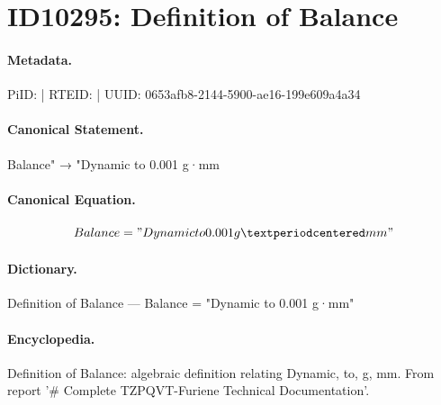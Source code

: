 \section*{ID10295: Definition of Balance}
\paragraph{Metadata.}
PiID:  | RTEID:  | UUID: 0653afb8-2144-5900-ae16-199e609a4a34

\paragraph{Canonical Statement.}
Balance" → "Dynamic to 0.001 g·mm

\paragraph{Canonical Equation.}
\[
Balance = "Dynamic to 0.001 g·mm"
\]

\paragraph{Dictionary.}
Definition of Balance — Balance = "Dynamic to 0.001 g·mm"

\paragraph{Encyclopedia.}
Definition of Balance: algebraic definition relating Dynamic, to, g, mm. From report '\# Complete TZPQVT-Furiene Technical Documentation'.
